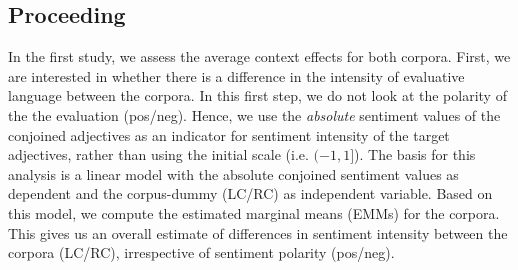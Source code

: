 \documentclass{article}
\begin{document}
\subsection{Proceeding}


In the first study, we assess the average context effects for both corpora. %
First, we are interested in whether there is a difference in the intensity of evaluative language between the corpora. In this first step, we do not look at the polarity of the the evaluation (pos/neg). Hence, we use the \textit{absolute} sentiment values of the conjoined adjectives as an indicator for sentiment intensity of the target adjectives, rather than using the initial scale (i.e. $(-1,1]$). The basis for this analysis is a linear model with the absolute conjoined sentiment values as dependent and the corpus-dummy (LC/RC) as independent variable. Based on this model, we compute the estimated marginal means (EMMs) for the corpora. This gives us an overall estimate of differences in sentiment intensity between the corpora (LC/RC), irrespective of sentiment polarity (pos/neg). 

\end{document}
